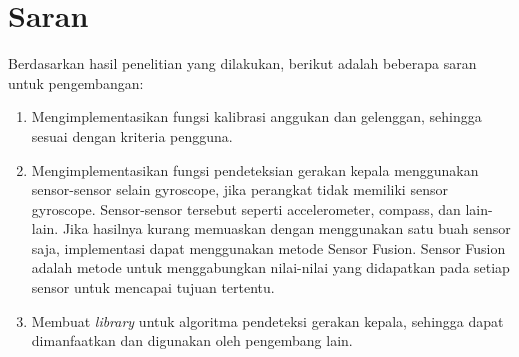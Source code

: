 \section{Saran}
\label{sec:saran}
Berdasarkan hasil penelitian yang dilakukan, berikut adalah beberapa saran untuk pengembangan:
\begin{enumerate}
    \item Mengimplementasikan fungsi kalibrasi anggukan dan gelenggan, sehingga sesuai dengan kriteria pengguna.
    \item Mengimplementasikan fungsi pendeteksian gerakan kepala menggunakan sensor-sensor selain gyroscope, jika perangkat tidak memiliki sensor gyroscope. Sensor-sensor tersebut seperti accelerometer, compass, dan lain-lain. Jika hasilnya kurang memuaskan dengan menggunakan satu buah sensor saja, implementasi dapat menggunakan metode Sensor Fusion. Sensor Fusion adalah metode untuk menggabungkan nilai-nilai yang didapatkan pada setiap sensor untuk mencapai tujuan tertentu.
    \item Membuat \textit{library} untuk algoritma pendeteksi gerakan kepala, sehingga dapat dimanfaatkan dan digunakan oleh pengembang lain.
\end{enumerate}